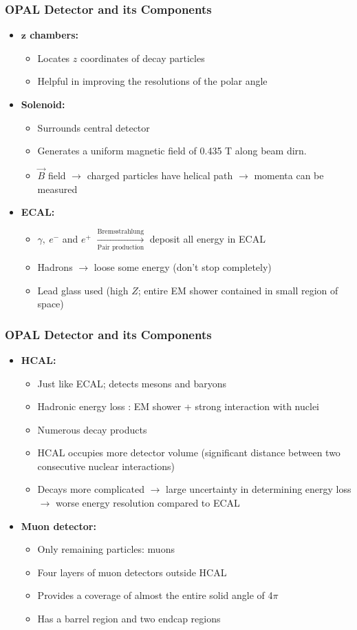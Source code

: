 \documentclass[10pt]{beamer}
\begin{document}
\begin{frame}
\frametitle{OPAL Detector and its Components}
\begin{itemize}
\item \textbf{$\mathbf{z}$ chambers:}
\begin{itemize}
\item Locates $z$ coordinates of decay particles
\item Helpful in improving the resolutions of the polar angle
\end{itemize}
\item \textbf{Solenoid:}
\begin{itemize}
\item Surrounds central detector
\item Generates a uniform magnetic field of 0.435 T along beam dirn.
\item $\vec{B}$ field $\rightarrow$ charged particles have helical path $\rightarrow$ momenta can be measured
\end{itemize}
\item \textbf{ECAL:}
\begin{itemize}
\item $\gamma ,\ e^{-}$ and $e^{+}$ $\xrightarrow[\text{Pair production}]{\text{Bremsstrahlung}}$ deposit all energy in ECAL
\item Hadrons $\rightarrow$ loose some energy (don't stop completely)
\item Lead glass used (high $Z$; entire EM shower contained in small region of space) 
\end{itemize}
\end{itemize}
\end{frame}

\begin{frame}
\frametitle{OPAL Detector and its Components}
\begin{itemize}
\item \textbf{HCAL:}
\begin{itemize}
\item Just like ECAL; detects mesons and baryons
\item Hadronic energy loss : EM shower + strong interaction with nuclei
\item Numerous decay products
\item HCAL occupies more detector volume (significant distance between two consecutive nuclear interactions)
\item Decays more complicated $\rightarrow$ large uncertainty in determining energy loss $\rightarrow$ worse energy resolution compared to ECAL
\end{itemize}
\item \textbf{Muon detector:}
\begin{itemize}
\item Only remaining particles: muons
\item Four layers of muon detectors outside HCAL
\item Provides a coverage of almost the entire solid angle of 4$\pi$ 
\item Has a barrel region and two endcap regions
\end{itemize}
\end{itemize}
\end{frame}
\end{document}
